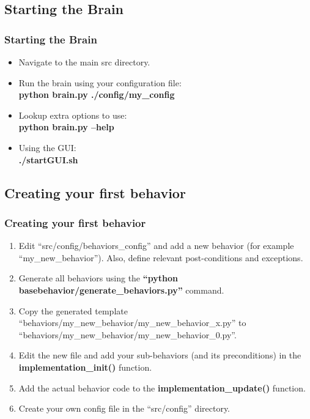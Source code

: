 \documentclass[]{beamer}
\begin{document}
\subsection{Starting the Brain}
\begin{frame}
    \frametitle{Starting the Brain}
    \begin{itemize}
        \item Navigate to the main src directory.
        \item Run the brain using your configuration file: \\
        \textbf{python brain.py ./config/my\_config}
        \item Lookup extra options to use: \\
        \textbf{python brain.py --help}
        \item Using the GUI: \\
        \textbf{./startGUI.sh}
    \end{itemize}
\end{frame}


\subsection{Creating your first behavior}
\begin{frame}
    \frametitle{Creating your first behavior}
    \begin{enumerate}
        \item Edit ``src/config/behaviors\_config'' and add a new behavior (for example ``my\_new\_behavior''). Also, define relevant post-conditions and exceptions.
        \item Generate all behaviors using the \textbf{``python basebehavior/generate\_behaviors.py''} command.
        \item Copy the generated template ``behaviors/my\_new\_behavior/my\_new\_behavior\_x.py'' to  ``behaviors/my\_new\_behavior/my\_new\_behavior\_0.py''.
        \item Edit the new file and add your sub-behaviors (and its preconditions) in the \textbf{implementation\_init()} function.
        \item Add the actual behavior code to the \textbf{implementation\_update()} function.
        \item Create your own config file in the ``src/config'' directory.
    \end{enumerate}
\end{frame}
\end{document}
